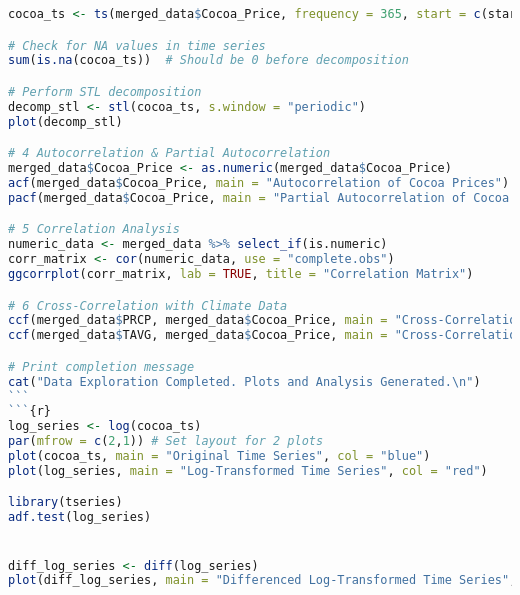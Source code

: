 \begin{lstlisting}[language=R]
cocoa_ts <- ts(merged_data$Cocoa_Price, frequency = 365, start = c(start_year, start_month))

# Check for NA values in time series
sum(is.na(cocoa_ts))  # Should be 0 before decomposition

# Perform STL decomposition
decomp_stl <- stl(cocoa_ts, s.window = "periodic")
plot(decomp_stl)

# 4 Autocorrelation & Partial Autocorrelation
merged_data$Cocoa_Price <- as.numeric(merged_data$Cocoa_Price)
acf(merged_data$Cocoa_Price, main = "Autocorrelation of Cocoa Prices")
pacf(merged_data$Cocoa_Price, main = "Partial Autocorrelation of Cocoa Prices")

# 5 Correlation Analysis
numeric_data <- merged_data %>% select_if(is.numeric)
corr_matrix <- cor(numeric_data, use = "complete.obs")
ggcorrplot(corr_matrix, lab = TRUE, title = "Correlation Matrix")

# 6 Cross-Correlation with Climate Data
ccf(merged_data$PRCP, merged_data$Cocoa_Price, main = "Cross-Correlation: Rainfall & Cocoa Prices")
ccf(merged_data$TAVG, merged_data$Cocoa_Price, main = "Cross-Correlation: Temperature & Cocoa Prices")

# Print completion message
cat("Data Exploration Completed. Plots and Analysis Generated.\n")
```
```{r}
log_series <- log(cocoa_ts)
par(mfrow = c(2,1)) # Set layout for 2 plots
plot(cocoa_ts, main = "Original Time Series", col = "blue")
plot(log_series, main = "Log-Transformed Time Series", col = "red")

library(tseries)
adf.test(log_series)


diff_log_series <- diff(log_series)
plot(diff_log_series, main = "Differenced Log-Transformed Time Series", col = "purple")

\end{lstlisting}
